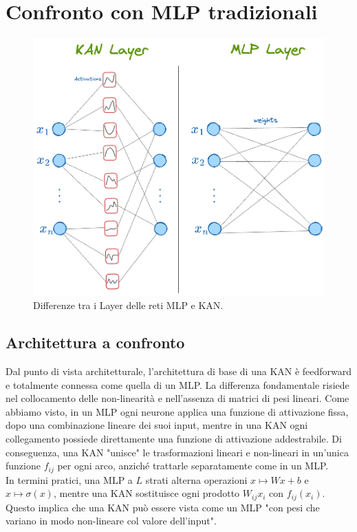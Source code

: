 \documentclass[a4paper,12pt]{report}
\begin{document}
	\section{Confronto con MLP tradizionali}
	
	\begin{figure}[H]
		\centering
		\includegraphics[width=1.0\textwidth]{img/KANvsMLP_layer.png}
		\caption{Differenze tra i Layer delle reti MLP e KAN.}
	\end{figure}
	
	\subsection{Architettura a confronto}
	Dal punto di vista architetturale, l’architettura di base di una KAN è feedforward e totalmente connessa come quella di un MLP. La differenza fondamentale risiede nel collocamento delle non-linearità e nell’assenza di matrici di pesi lineari. Come abbiamo visto, in un MLP ogni neurone applica una funzione di attivazione fissa, dopo una combinazione lineare dei suoi input, mentre in una KAN ogni collegamento possiede direttamente una funzione di attivazione addestrabile. Di conseguenza, una KAN "unisce" le trasformazioni lineari e non-lineari in un’unica funzione $f_{ij}$ per ogni arco, anziché trattarle separatamente come in un MLP. \\
	In termini pratici, una MLP a $L$ strati alterna operazioni $x \mapsto W x + b$ e $x \mapsto \sigma(x)$, mentre una KAN sostituisce ogni prodotto $W_{ij}x_i$ con $f_{ij}(x_i)$. Questo implica che una KAN può essere vista come un MLP "con pesi che variano in modo non-lineare col valore dell'input". \\
	
\end{document}
